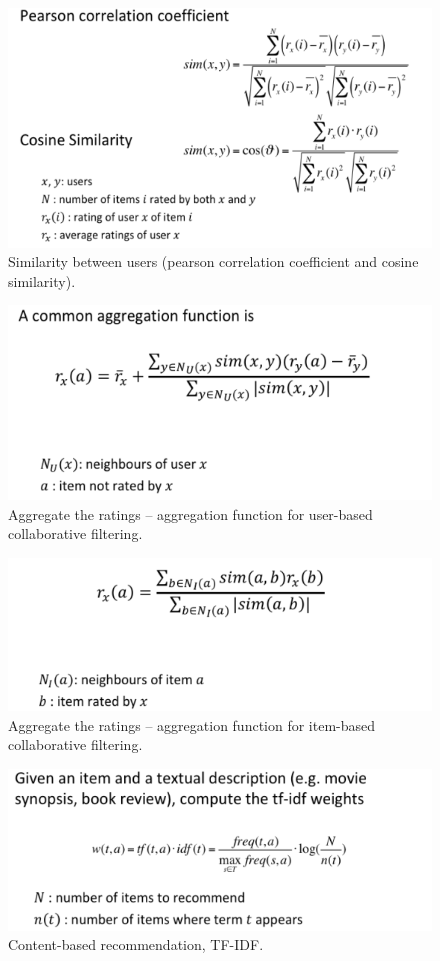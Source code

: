     \begin{figure}[htp]
      \centering
        \includegraphics[width=.6\textwidth]{images/simusers.png}
        \caption{Similarity between users (pearson correlation coefficient and cosine similarity).}
        \label{fig:simusers}
    \end{figure}


    \begin{figure}[htp]
      \centering
        \includegraphics[width=.6\textwidth]{images/simusers2.png}
        \caption{Aggregate the ratings -- aggregation function for user-based collaborative filtering.}
        \label{fig:simusers2}
    \end{figure}

    \begin{figure}[htp]
      \centering
        \includegraphics[width=.6\textwidth]{images/simusers3.png}
        \caption{Aggregate the ratings -- aggregation function for item-based collaborative filtering.}
        \label{fig:simusers3}
    \end{figure}

    \begin{figure}[htp]
      \centering
        \includegraphics[width=.6\textwidth]{images/cbrec.png}
        \caption{Content-based recommendation, TF-IDF.}
        \label{fig:cbrec}
    \end{figure}


